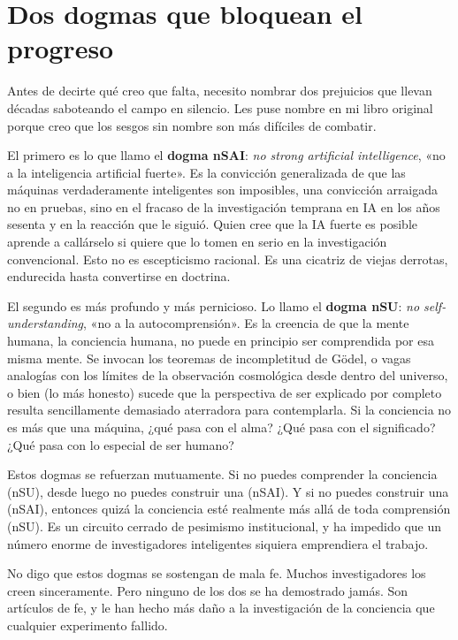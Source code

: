 \documentclass[11pt, twoside, openright]{book}
\begin{document}
\section*{Dos dogmas que bloquean el progreso}

Antes de decirte qué creo que falta, necesito nombrar dos prejuicios que llevan décadas saboteando el campo en silencio. Les puse nombre en mi libro original porque creo que los sesgos sin nombre son más difíciles de combatir.

El primero es lo que llamo el \textbf{dogma nSAI}: \textit{no strong artificial intelligence}, «no a la inteligencia artificial fuerte». Es la convicción generalizada de que las máquinas verdaderamente inteligentes son imposibles, una convicción arraigada no en pruebas, sino en el fracaso de la investigación temprana en IA en los años sesenta y en la reacción que le siguió. Quien cree que la IA fuerte es posible aprende a callárselo si quiere que lo tomen en serio en la investigación convencional. Esto no es escepticismo racional. Es una cicatriz de viejas derrotas, endurecida hasta convertirse en doctrina.

El segundo es más profundo y más pernicioso. Lo llamo el \textbf{dogma nSU}: \textit{no self-understanding}, «no a la autocomprensión». Es la creencia de que la mente humana, la conciencia humana, no puede en principio ser comprendida por esa misma mente. Se invocan los teoremas de incompletitud de Gödel, o vagas analogías con los límites de la observación cosmológica desde dentro del universo, o bien (lo más honesto) sucede que la perspectiva de ser explicado por completo resulta sencillamente demasiado aterradora para contemplarla. Si la conciencia no es más que una máquina, ¿qué pasa con el alma? ¿Qué pasa con el significado? ¿Qué pasa con lo especial de ser humano?

Estos dogmas se refuerzan mutuamente. Si no puedes comprender la conciencia (nSU), desde luego no puedes construir una (nSAI). Y si no puedes construir una (nSAI), entonces quizá la conciencia esté realmente más allá de toda comprensión (nSU). Es un circuito cerrado de pesimismo institucional, y ha impedido que un número enorme de investigadores inteligentes siquiera emprendiera el trabajo.

No digo que estos dogmas se sostengan de mala fe. Muchos investigadores los creen sinceramente. Pero ninguno de los dos se ha demostrado jamás. Son artículos de fe, y le han hecho más daño a la investigación de la conciencia que cualquier experimento fallido.
\end{document}
